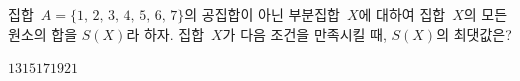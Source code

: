 집합~$A=\{1,\,2,\,3,\,4,\,5,\,6,\,7\}$의 공집합이 아닌 부분집합~$X$에 대하여 집합~$X$의 모든 원소의 합을 $S(X)$라 하자. 집합~$X$가 다음 조건을 만족시킬 때, $S(X)$의 최댓값은? 
\begin{choices32}{$13$}{$15$}{$17$}{$19$}{$21$}\end{choices32}
